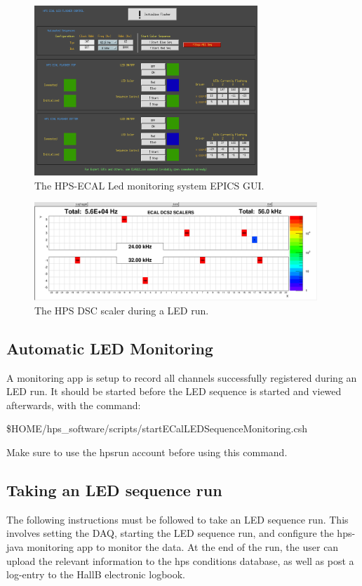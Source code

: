 \documentclass[12pt]{article}
\begin{document}
\begin{figure}[htbp]
\center
\includegraphics[width=0.75\textwidth]{pics/FlasherMEDM.png}
\caption{\small \label{FlasherMEDM} The HPS-ECAL Led monitoring system EPICS GUI.}
\end{figure}
\begin{figure}[htbp]
\center
\includegraphics[width=0.95\textwidth]{pics/DSCScalersLED_2014_12_20.png}
\caption{\small \label{LEDScalers} The HPS DSC scaler during a LED run.}
\end{figure}
\newpage
\subsection{Automatic LED Monitoring}
A monitoring app is setup to record all channels successfully registered during an LED run.  It should be started before the LED sequence is started and viewed afterwards, with the command: \begin{center}\$HOME/hps\_software/scripts/startECalLEDSequenceMonitoring.csh\end{center} Make sure to use the hpsrun account before using this command.
  
\subsection{Taking an LED sequence run}
The following instructions must be followed to take an LED sequence run. This involves setting the DAQ, starting the LED sequence run, and configure the hps-java monitoring app to monitor the data. At the end of the run, the user can upload the relevant information to the hps conditions database, as well as post a log-entry to the HallB electronic logbook.
\end{document}
